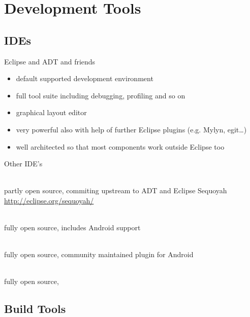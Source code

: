\documentclass[aspectratio=169]{beamer}
\newcommand{\surl}[1] {{\tiny \url{#1}}}
\begin{document}
\section{Development Tools}

  \subsection{IDEs}

    \begin{frame}{Eclipse and ADT and friends}
        \begin{itemize}
          \item<1-> default supported development environment 
          \item<2-> full tool suite including debugging, profiling and so on
          \item<3-> graphical layout editor
          \item<4-> very powerful also with help of further Eclipse plugins (e.g. Mylyn, egit\dots)
          \item<5-> well architected so that most components work outside Eclipse too
        \end{itemize}
    \end{frame}

    \begin{frame}{Other IDE's}
      \begin{description}
        \item<1->[Motorola MOTODEV Studio \surl{http://developer.motorola.com/docstools/motodevstudio/}] \hfill \\  partly open source, commiting upstream to ADT and Eclipse Sequoyah \surl{http://eclipse.org/sequoyah/} 
        \item<2->[Jetbrains IntelliJ IDEA CE \surl{http://www.jetbrains.org/}] \hfill \\ fully open source, includes Android support 
        \item<3->[Oracle Netbeans \surl{http://kenai.com/projects/nbandroid/}] \hfill \\ fully open source, community maintained plugin for Android 
        \item<4->[Emacs \surl{http://gitorious.org/emacs-android-minor-mode}] \hfill \\ fully open source, 
      \end{description}
    \end{frame}

  \subsection{Build Tools}
\end{document}
